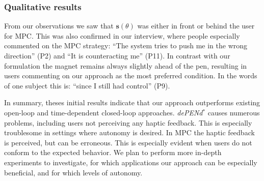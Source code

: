 \subsubsection{Qualitative results} 
From our observations we saw that $\mathbf{s}(\theta)$ was either in front or behind the user for MPC. 
This was also confirmed in our interview, where people especially commented on the MPC strategy: ``The system tries to push me in the wrong direction'' (P2) and ``It is counteracting me'' (P11). 
In contrast with our formulation the magnet remains always slightly ahead of the pen, resulting in users commenting on our approach as the most preferred condition. 
In the words of one subject this is: ``since I still had control'' (P9). 

In summary, theses initial results indicate that our approach outperforms existing open-loop and time-dependent closed-loop approaches. 
\emph{dePENd$^{*}$} causes numerous problems, including users not perceiving any haptic feedback. 
This is especially troublesome in settings where autonomy is desired. 
In MPC the haptic feedback is perceived, but can be erroneous. 
This is especially evident when users do not conform to the expected behavior. 
We plan to perform more in-depth experiments to investigate, for which applications our approach can be especially beneficial, and for which levels of autonomy.

